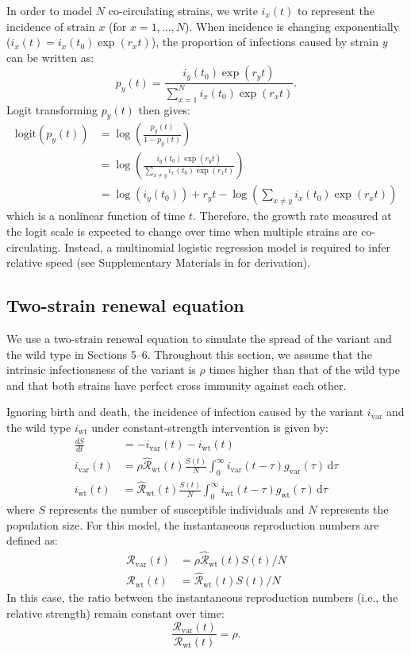 \documentclass[12pt]{article}
\newcommand{\vvvar}{\mathrm{var}}
\newcommand{\wwwt}{\mathrm{wt}}
\newcommand{\Rx}[1]{\ensuremath{{\mathcal R}_{#1}}\xspace}
\newcommand{\RR}{\ensuremath{{\mathcal R}}\xspace}
\newcommand{\Rw}{\Rx{\wwwt}}
\newcommand{\Rv}{\Rx{\vvvar}}
\newcommand{\hRw}{\hat{\RR}_{\wwwt}}
\newcommand{\dd}[1]{\ensuremath{\, \mathrm{d}#1}}
\newcommand{\dtau}{\dd{\tau}}
\newcommand{\ix}[1]{\ensuremath{{i}_{#1}}\xspace}
\newcommand{\iw}{\ix{\wwwt}}
\newcommand{\iv}{\ix{\vvvar}}
\begin{document}
In order to model $N$ co-circulating strains, we write $i_x(t)$ to represent the incidence of strain $x$ (for $x = 1, \dots, N$).
When incidence is changing exponentially ($i_x(t) = i_x(t_0) \exp(r_x t)$), the proportion of infections caused by strain $y$ can be written as:
\begin{equation}
p_y(t) = \frac{i_y(t_0) \exp(r_y t)}{\sum_{x=1}^N i_x(t_0) \exp(r_x t)}.
\end{equation}
Logit transforming $p_y(t)$ then gives:
\begin{align}
\mathrm{logit}(p_y(t)) &= \log\left(\frac{p_y(t)}{1-p_y(t)}\right)\\
&= \log\left(\frac{i_y(t_0) \exp(r_y t)}{\sum_{x \neq y} i_x(t_0) \exp(r_x t)}\right)\\
&= \log(i_y(t_0)) + r_y t - \log \left(\sum_{x \neq y} i_x(t_0) \exp(r_x t)\right)
\end{align}
which is a nonlinear function of time $t$.
Therefore, the growth rate measured at the logit scale is expected to change over time when multiple strains are co-circulating. 
Instead, a multinomial logistic regression model is required to infer relative speed (see Supplementary Materials in \citep{campbell2021increased} for derivation).

\subsection{Two-strain renewal equation}

We use a two-strain renewal equation to simulate the spread of the variant and the wild type in Sections 5--6.
Throughout this section, we assume that the intrinsic infectiousness of the variant is $\rho$ times higher than that of the wild type and that both strains have perfect cross immunity against each other.

Ignoring birth and death, the incidence of infection caused by the variant $\iv$ and the wild type $\iw$ under constant-strength intervention is given by:
\begin{align}
\frac{dS}{dt} &= - \iv(t) - \iw(t)\\
\iv(t) &= \rho  \hRw(t) \frac{S(t)}{N} \int_{0}^\infty \iv(t-\tau) g_{\mathrm{var}}(\tau) \dtau\\
\iw(t) &= \hRw(t) \frac{S(t)}{N}  \int_{0}^\infty \iw(t-\tau) g_{\mathrm{wt}}(\tau) \dtau
\end{align}
where $S$ represents the number of susceptible individuals and $N$ represents the population size.
For this model, the instantaneous reproduction numbers are defined as:
\begin{align}
\Rv(t) &= \rho  \hRw(t)S(t)/N\\
\Rw(t) &=\hRw(t) S(t) /N
\end{align}
In this case, the ratio between the instantaneous reproduction numbers (i.e., the relative strength) remain constant over time:
\begin{equation}
\frac{\Rv(t)}{\Rw(t)} = \rho.
\end{equation}
\end{document}
